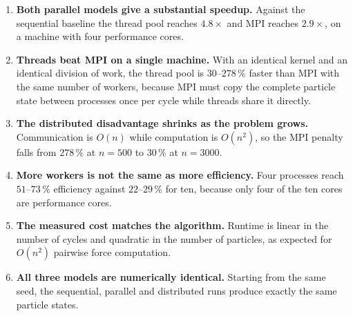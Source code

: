 \documentclass[sigconf]{acmart}
\begin{document}
\begin{enumerate}
    \item \textbf{Both parallel models give a substantial speedup.} Against the sequential baseline
          the thread pool reaches $4.8\times$ and MPI reaches $2.9\times$, on a machine with four
          performance cores.

    \item \textbf{Threads beat MPI on a single machine.} With an identical kernel and an identical
          division of work, the thread pool is $30$--$278\,\%$ faster than MPI with the same number
          of workers, because MPI must copy the complete particle state between processes once per
          cycle while threads share it directly.

    \item \textbf{The distributed disadvantage shrinks as the problem grows.} Communication is
          $O(n)$ while computation is $O(n^2)$, so the MPI penalty falls from $278\,\%$ at
          $n = 500$ to $30\,\%$ at $n = 3000$.

    \item \textbf{More workers is not the same as more efficiency.} Four processes reach
          $51$--$73\,\%$ efficiency against $22$--$29\,\%$ for ten, because only four of the ten
          cores are performance cores.

    \item \textbf{The measured cost matches the algorithm.} Runtime is linear in the number of
          cycles and quadratic in the number of particles, as expected for $O(n^2)$ pairwise force
          computation.

    \item \textbf{All three models are numerically identical.} Starting from the same seed, the
          sequential, parallel and distributed runs produce exactly the same particle states.
\end{enumerate}
\end{document}
